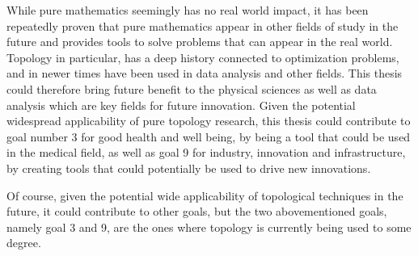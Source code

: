 While pure mathematics seemingly has no real world impact, it has been repeatedly proven that pure mathematics appear in other fields of study in the future and provides tools to solve problems that can appear in the real world. Topology in particular, has a deep history connected to optimization problems, and in newer times have been used in data analysis and other fields. This thesis could therefore bring future benefit to the physical sciences as well as data analysis which are key fields for future innovation. Given the potential widespread applicability of pure topology research, this thesis could contribute to goal number 3 for good health and well being, by being a tool that could be used in the medical field, as well as goal 9 for industry, innovation and infrastructure, by creating tools that could potentially be used to drive new innovations.

Of course, given the potential wide applicability of topological techniques in the future, it could contribute to other goals, but the two abovementioned goals, namely goal 3 and 9, are the ones where topology is currently being used to some degree.
